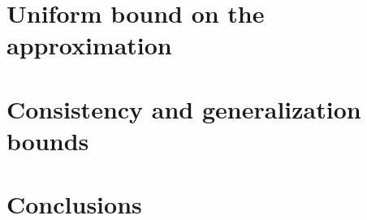 \chapterend

\section{Uniform bound on the approximation}
\label{sec:uniform_bound_on_the_approximation}

\section{Consistency and generalization bounds}
\label{sec:consistency and generalization bounds}

\section{Conclusions}
\label{sec:conclusions}
